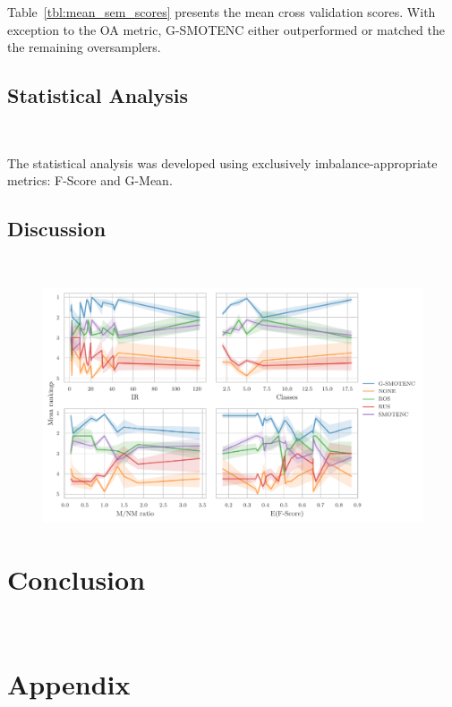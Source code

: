 \documentclass[parskip=full]{scrartcl}
\begin{document}


Table~\ref{tbl:mean_sem_scores} presents the mean cross validation scores.
With exception to the OA metric, G-SMOTENC either outperformed or matched the
the remaining oversamplers.



\subsection{Statistical Analysis}~\label{sec:statistical_analysis}

The statistical analysis was developed using exclusively imbalance-appropriate
metrics: F-Score and G-Mean. 







\subsection{Discussion}~\label{sec:discussion}

\begin{figure}
	\centering
	\includegraphics[width=\linewidth]{../analysis/consistency_analysis_plot}
\end{figure}

\section{Conclusion}~\label{sec:conclusion}




\appendix

\section{Appendix}


\end{document}
